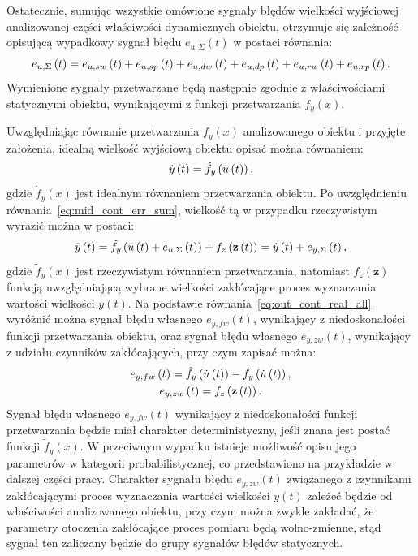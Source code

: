Ostatecznie, sumując wszystkie omówione sygnały błędów wielkości wyjściowej analizowanej części właściwości dynamicznych obiektu, otrzymuje się zależność opisującą wypadkowy sygnał błędu $e_{u,\Sigma}(t)$ w postaci równania:
\begin{equation}
e_{u,\Sigma} \left(t\right) = e_{u,sw} \left(t\right) + e_{u,sp} \left(t\right) + e_{u,dw} \left(t\right) + e_{u,dp} \left(t\right) + e_{u,rw} \left(t\right) + e_{u,rp} \left(t\right) \label{eq:mid_cont_err_sum}.
\end{equation}
Wymienione sygnały przetwarzane będą następnie zgodnie z właściwościami statycznymi obiektu, wynikającymi z funkcji przetwarzania $f_{y}(x)$.

Uwzględniając równanie przetwarzania $f_{y}(x)$ analizowanego obiektu i przyjęte założenia, idealną wielkość wyjściową obiektu opisać można równaniem:
\begin{equation}
\dot{y} \left(t\right) = \dot{f}_{y} \left( \dot{u} \left(t\right) \right) \label{eq:out_cont_ideal_all},
\end{equation}
gdzie $\dot{f}_{y}(x)$ jest idealnym równaniem przetwarzania obiektu. Po uwzględnieniu równania~\eqref{eq:mid_cont_err_sum}, wielkość tą w przypadku rzeczywistym wyrazić można w postaci:
\begin{equation}
\tilde{y} \left(t\right) = \tilde{f}_{y} \left( \dot{u} \left(t\right) + e_{u,\Sigma} \left(t\right) \right) + f_{z} \left(\mathbf{z} \left(t\right)\right) = \dot{y} \left(t\right) + e_{y,\Sigma} \left(t\right) \label{eq:out_cont_real_all},
\end{equation}
gdzie $\tilde{f}_{y}(x)$ jest rzeczywistym równaniem przetwarzania, natomiast $f_{z}(\mathbf{z})$ funkcją uwzględniającą wybrane wielkości zakłócające proces wyznaczania wartości wielkości $y(t)$. Na podstawie równania~\eqref{eq:out_cont_real_all} wyróżnić można sygnał błędu własnego $e_{y,fw}(t)$, wynikający z niedoskonałości funkcji przetwarzania obiektu, oraz sygnał błędu własnego $e_{y,zw}(t)$, wynikający z udziału czynników zakłócających, przy czym zapisać można:
\begin{gather}
e_{y,fw} \left(t\right) = \tilde{f}_{y} \left( \dot{u} \left(t\right) \right) - \dot{f}_{y} \left( \dot{u} \left(t\right) \right) \label{eq:out_cont_err_funct_self}, \\
e_{y,zw} \left(t\right) = f_{z} \left(\mathbf{z} \left(t\right)\right) \label{eq:out_cont_err_env_self}.
\end{gather}
Sygnał błędu własnego $e_{y,fw}(t)$ wynikający z niedoskonałości funkcji przetwarzania będzie miał charakter deterministyczny, jeśli znana jest postać funkcji $\tilde{f}_{y}(x)$. W przeciwnym wypadku istnieje możliwość opisu jego parametrów w kategorii probabilistycznej, co przedstawiono na przykładzie w dalszej części pracy. Charakter sygnału błędu $e_{y,zw}(t)$ związanego z czynnikami zakłócającymi proces wyznaczania wartości wielkości $y(t)$ zależeć będzie od właściwości analizowanego obiektu, przy czym można zwykle zakładać, że parametry otoczenia zakłócające proces pomiaru będą wolno-zmienne, stąd sygnał ten zaliczany będzie do grupy sygnałów błędów statycznych.

